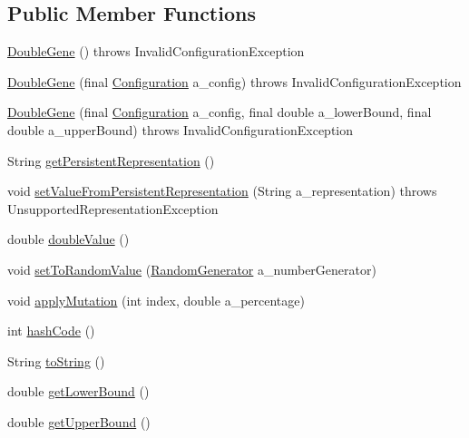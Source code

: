 \subsection*{Public Member Functions}
\begin{DoxyCompactItemize}
\item 
\hyperlink{classorg_1_1jgap_1_1impl_1_1_double_gene_aea962046b97d87bd6e4b9180295587eb}{Double\-Gene} ()  throws Invalid\-Configuration\-Exception 
\item 
\hyperlink{classorg_1_1jgap_1_1impl_1_1_double_gene_ab207a560e848e93ae4ae53ad1b422357}{Double\-Gene} (final \hyperlink{classorg_1_1jgap_1_1_configuration}{Configuration} a\-\_\-config)  throws Invalid\-Configuration\-Exception 
\item 
\hyperlink{classorg_1_1jgap_1_1impl_1_1_double_gene_acf5e9830d934ce129e690dafd1ee0101}{Double\-Gene} (final \hyperlink{classorg_1_1jgap_1_1_configuration}{Configuration} a\-\_\-config, final double a\-\_\-lower\-Bound, final double a\-\_\-upper\-Bound)  throws Invalid\-Configuration\-Exception 
\item 
String \hyperlink{classorg_1_1jgap_1_1impl_1_1_double_gene_a8da36e3431c7c509e2e09285e47da105}{get\-Persistent\-Representation} ()
\item 
void \hyperlink{classorg_1_1jgap_1_1impl_1_1_double_gene_a9b71158d4e12d38732f9b60bf2ba1949}{set\-Value\-From\-Persistent\-Representation} (String a\-\_\-representation)  throws Unsupported\-Representation\-Exception 
\item 
double \hyperlink{classorg_1_1jgap_1_1impl_1_1_double_gene_ad4a32fa2f8796bc1598539e93a72e39f}{double\-Value} ()
\item 
void \hyperlink{classorg_1_1jgap_1_1impl_1_1_double_gene_aa60b29de6b26966ef4038bc02ccc2fd7}{set\-To\-Random\-Value} (\hyperlink{interfaceorg_1_1jgap_1_1_random_generator}{Random\-Generator} a\-\_\-number\-Generator)
\item 
void \hyperlink{classorg_1_1jgap_1_1impl_1_1_double_gene_a7cb99b828171a8f23c191876a3fd3c46}{apply\-Mutation} (int index, double a\-\_\-percentage)
\item 
int \hyperlink{classorg_1_1jgap_1_1impl_1_1_double_gene_ac1e682ba44a3708cc505d78415ee5b6d}{hash\-Code} ()
\item 
String \hyperlink{classorg_1_1jgap_1_1impl_1_1_double_gene_a9819e6f329bd77276a5821b4c433cd6e}{to\-String} ()
\item 
double \hyperlink{classorg_1_1jgap_1_1impl_1_1_double_gene_a5d7bdb546951bbae98ee0aa5d7f3fa09}{get\-Lower\-Bound} ()
\item 
double \hyperlink{classorg_1_1jgap_1_1impl_1_1_double_gene_a6310705faae7069e39bc0da68b9b2e3b}{get\-Upper\-Bound} ()
\end{DoxyCompactItemize}
